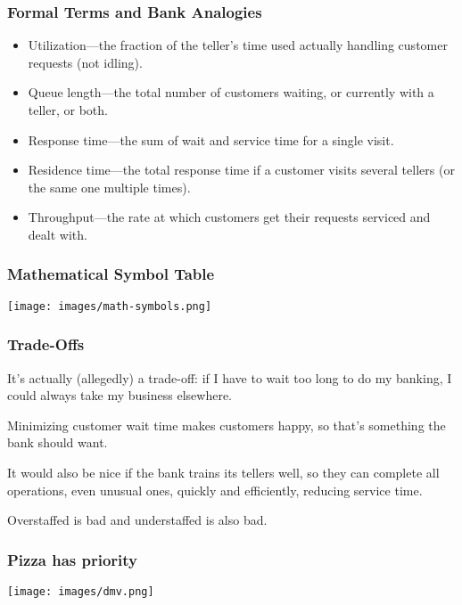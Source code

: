 \begin{frame}
\frametitle{Formal Terms and Bank Analogies}

\begin{itemize}
	\item Utilization---the fraction of the teller's time used actually handling customer requests (not idling).
	\item Queue length---the total number of customers waiting, or currently with a teller, or both.
	\item Response time---the sum of wait and service time for a single visit.
	\item Residence time---the total response time if a customer visits several tellers (or the same one multiple times).
	\item Throughput---the rate at which customers get their requests serviced and dealt with.
\end{itemize}

\end{frame}



\begin{frame}
\frametitle{Mathematical Symbol Table}

\begin{center}
	\texttt{[image: images/math-symbols.png]}
\end{center}

\end{frame}



\begin{frame}
\frametitle{Trade-Offs}

It's actually (allegedly) a trade-off: if I have to wait too long to do my banking, I could always take my business elsewhere. 

Minimizing customer wait time makes customers happy, so that's something the bank should want. 

It would also be nice if the bank trains its tellers well, so they can complete all operations, even unusual ones, quickly and efficiently, reducing service time.

Overstaffed is bad and understaffed is also bad. 

\end{frame}


\begin{frame}
\frametitle{Pizza has priority}

\begin{center}
	\texttt{[image: images/dmv.png]}
\end{center}

\end{frame}



